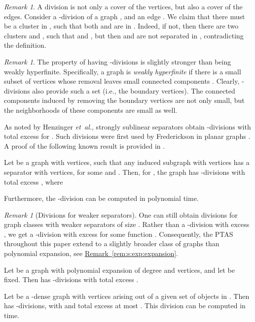 \documentclass[12pt]{article}
\newcommand{\etal}{\textit{et~al.}\xspace}
\newcommand{\Term}[1]{\textsf{#1}}
\theoremstyle{remark}\theoremheaderfont{\sf}\theorembodyfont{\upshape}
\newtheorem*{remark:unnumbered}[theorem]{Remark}\newtheorem{remark}[theorem]{Remark}\newtheorem{example}[theorem]{Example}
\numberwithin{figure}{section}\numberwithin{table}{section}\numberwithin{equation}{section}
\newcommand{\HLink}[2]{\hyperref[#2]{#1~\ref*{#2}}}
\newcommand{\corlab}[1]{\label{cor:#1}}
\newcommand{\lemlab}[1]{\label{lemma:#1}}
\newcommand{\itemlab}[1]{\label{item:#1}}
\newcommand{\remlab}[1]{\label{rem:#1}}
\newcommand{\remref}[1]{\HLink{Remark}{rem:#1}}
\newcommand{\PTAS}{\Term{PTAS}\xspace}
\begin{document}
\begin{remark:unnumbered}
  A division is not only a cover of the vertices, but also a cover of
  the edges. Consider a {-division}  of a graph
  , and an edge . We claim that there
  must be a cluster  in , such that both  and  are in
  . Indeed, if not, then there are two clusters  and ,
  such that  and , but then
   and  are not
  separated in , contradicting the definition.
\end{remark:unnumbered}


\begin{remark:unnumbered}
  The property of having -divisions is slightly stronger than
  being weakly hyperfinite.  Specifically, a graph is \emph{weakly
    hyperfinite} if there is a small subset of vertices whose removal
  leaves small connected components \cite[Section
  16.2]{no-s-12}. Clearly, -divisions also provide such a set
  (i.e., the boundary vertices). The connected components induced by
  removing the boundary vertices are not only small, but the
  neighborhoods of these components are small as well.
\end{remark:unnumbered}

As noted by Henzinger \etal \cite{hkrs-fspap-97}, strongly sublinear
separators obtain -divisions with total excess  for
.  Such divisions were first used by
Frederickson in planar graphs \cite{f-faspp-87}. A proof of the
following known result is provided in \cite{hq-naape-16-arxiv}.
\begin{lemma}
  \lemlab{divisions:small:excess}Let  be a graph with  vertices, such that any induced
  subgraph with  vertices has a separator with
   vertices, for some  and
  .  Then, for , the graph  has
  -divisions with total excess , where
  
  Furthermore, the -division can be computed in polynomial
  time.
\end{lemma}

\begin{remark}[Divisions for weaker separators]
  \remlab{w:div:small:excess}One can still obtain divisions for graph classes with weaker
  separators of size . Rather than a
  -division with excess , we get a
  -division with excess  for some function .
  Consequently, the \PTAS throughout this paper extend to a slightly
  broader class of graphs than polynomial expansion, see
  \remref{s:exp:expansion}.
\end{remark}

\begin{corollary}
  \corlab{dev;p:e:l:dense}\begin{inparaenum}[(A)]
  \item \itemlab{p:e:divisions} Let  be a graph with polynomial expansion of degree 
    and  vertices, and let  be fixed. Then  has
    -divisions with total
    excess .

    \smallskip \item \itemlab{l:d:divisions} Let  be a -dense graph with  vertices
    arising out of a given set of objects in . Then 
    has -divisions, with 
    and total excess at most . This division can be computed
    in  time.
  \end{inparaenum}
\end{corollary}
\end{document}
